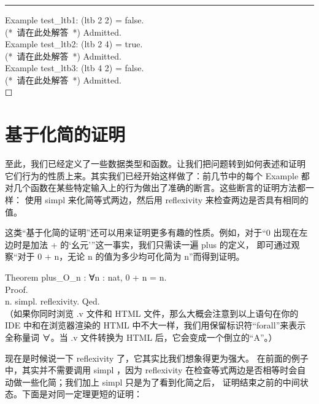 \documentclass[utf8]{ctexart}
\begin{document}
\begin{center}\rule{0.5\linewidth}{\linethickness}\end{center}

{Example} {test\_ltb1}: ({ltb} 2 2) = {false}.\\
{(*~请在此处解答~*)} {Admitted}.\\
{Example} {test\_ltb2}: ({ltb} 2 4) = {true}.\\
{(*~请在此处解答~*)} {Admitted}.\\
{Example} {test\_ltb3}: ({ltb} 4 2) = {false}.\\
{(*~请在此处解答~*)} {Admitted}.\\

{☐}

\protect\hypertarget{lab33}{}{}

\hypertarget{ux57faux4e8eux5316ux7b80ux7684ux8bc1ux660e}{%
\section{基于化简的证明}\label{ux57faux4e8eux5316ux7b80ux7684ux8bc1ux660e}}

至此，我们已经定义了一些数据类型和函数。让我们把问题转到如何表述和证明
它们行为的性质上来。其实我们已经开始这样做了：前几节中的每个 {{Example}}
都对几个函数在某些特定输入上的行为做出了准确的断言。这些断言的证明方法都一样：
使用 {{simpl}} 来化简等式两边，然后用 {{reflexivity}}
来检查两边是否具有相同的值。

这类``基于化简的证明''还可以用来证明更多有趣的性质。例如，对于``{0}
出现在左边时是加法 {+} 的`幺元'''这一事实，我们只需读一遍 {{plus}}
的定义， 即可通过观察``对于 {0} {+} {{n}}，无论 {{n}}
的值为多少均可化简为 {{n}}''而得到证明。

{Theorem} {plus\_O\_n} : {∀}{n} : {nat}, 0 + {n} = {n}.\\
{Proof}.\\
\hspace*{0.333em}\hspace*{0.333em}{intros} {n}. {simpl}. {reflexivity}.
{Qed}.\\

（如果你同时浏览 {.{v}} 文件和 HTML 文件，那么大概会注意到以上语句在你的
IDE 中和在浏览器渲染的 HTML
中不大一样，我们用保留标识符``forall''来表示全称量词 {{∀}}。当 {.{v}}
文件转换为 HTML 后，它会变成一个倒立的``A''。）

现在是时候说一下 {{reflexivity}} 了，它其实比我们想象得更为强大。
在前面的例子中，其实并不需要调用 {{simpl}} ，因为 {{reflexivity}}
在检查等式两边是否相等时会自动做一些化简；我们加上 {{simpl}}
只是为了看到化简之后，
证明结束之前的中间状态。下面是对同一定理更短的证明：
\end{document}

